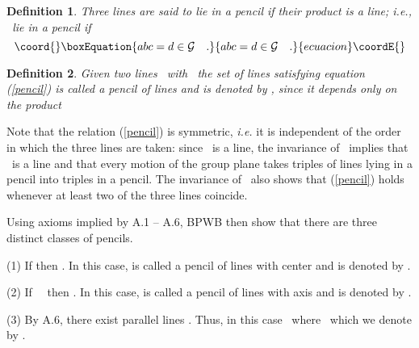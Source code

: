 \documentclass[a4paper,twoside,12pt]{article}
\newtheorem{definition}{Definition}[section]
\begin{document}
\begin{definition} Three lines are said to lie in a pencil if their
product is a line; {\it i.e.}, \coordHE{}\ lie in a pencil if 
%
\begin{equation}\coord{}\boxEquation{
abc=d \in \mathcal{G} \quad . \label{pencil}
}{
abc=d \in \mathcal{G} \quad . }{ecuacion}\coordE{}\end{equation}
\end{definition}

\begin{definition} Given two lines \coordHE{}\ with \coordHE{}\ the set
of lines \coordHE{} satisfying equation (\ref{pencil}) is called a pencil of
lines and is denoted by \coordHE{}, since it depends only on the product
\coordHE{}
\end{definition}

     Note that the relation (\ref{pencil}) is symmetric, {\it i.e.} it
is independent of the order in which the three lines are taken: since
\coordHE{}\ is a line, the invariance of \coordHE{}\ implies
that \coordHE{}\ is a line and that every motion of the group
plane takes triples of lines lying in a pencil into triples in a
pencil. The invariance of \coordHE{}\ also shows that
(\ref{pencil}) holds whenever at least two of the three lines
coincide.

     Using axioms implied by A.1 -- A.6, BPWB then show that there are
three distinct classes of pencils.

   (1) If \coordHE{} then \coordHE{}. In this case, \coordHE{} is
called a pencil of lines with center \coordHE{} and is denoted by \coordHE{}.

   (2) If \coordHE{}\ \coordHE{}\ then \coordHE{}. In this case, \coordHE{} is
called a pencil of lines with axis \coordHE{} and is denoted by \coordHE{}.

   (3) By A.6, there exist parallel lines \coordHE{}. Thus, in this case 
\coordHE{}\ where \coordHE{}\ which we denote by 
\coordHE{}. 
\end{document}

